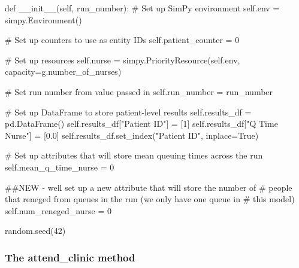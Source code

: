 \documentclass[
  letterpaper,
  DIV=11,
  numbers=noendperiod]{scrreprt}
\newenvironment{Shaded}{\begin{snugshade}}{\end{snugshade}}
\newcommand{\CommentTok}[1]{\textcolor[rgb]{0.37,0.37,0.37}{#1}}
\newcommand{\DecValTok}[1]{\textcolor[rgb]{0.68,0.00,0.00}{#1}}
\newcommand{\FloatTok}[1]{\textcolor[rgb]{0.68,0.00,0.00}{#1}}
\newcommand{\FunctionTok}[1]{\textcolor[rgb]{0.28,0.35,0.67}{#1}}
\newcommand{\KeywordTok}[1]{\textcolor[rgb]{0.00,0.23,0.31}{#1}}
\newcommand{\NormalTok}[1]{\textcolor[rgb]{0.00,0.23,0.31}{#1}}
\newcommand{\OperatorTok}[1]{\textcolor[rgb]{0.37,0.37,0.37}{#1}}
\newcommand{\StringTok}[1]{\textcolor[rgb]{0.13,0.47,0.30}{#1}}
\newcommand{\VariableTok}[1]{\textcolor[rgb]{0.07,0.07,0.07}{#1}}
\begin{document}
\begin{Shaded}
\begin{Highlighting}[]
\KeywordTok{def} \FunctionTok{\_\_init\_\_}\NormalTok{(}\VariableTok{self}\NormalTok{, run\_number):}
    \CommentTok{\# Set up SimPy environment}
    \VariableTok{self}\NormalTok{.env }\OperatorTok{=}\NormalTok{ simpy.Environment()}

    \CommentTok{\# Set up counters to use as entity IDs}
    \VariableTok{self}\NormalTok{.patient\_counter }\OperatorTok{=} \DecValTok{0}

    \CommentTok{\# Set up resources}
    \VariableTok{self}\NormalTok{.nurse }\OperatorTok{=}\NormalTok{ simpy.PriorityResource(}\VariableTok{self}\NormalTok{.env,}
\NormalTok{                                        capacity}\OperatorTok{=}\NormalTok{g.number\_of\_nurses)}

    \CommentTok{\# Set run number from value passed in}
    \VariableTok{self}\NormalTok{.run\_number }\OperatorTok{=}\NormalTok{ run\_number}

    \CommentTok{\# Set up DataFrame to store patient{-}level results}
    \VariableTok{self}\NormalTok{.results\_df }\OperatorTok{=}\NormalTok{ pd.DataFrame()}
    \VariableTok{self}\NormalTok{.results\_df[}\StringTok{"Patient ID"}\NormalTok{] }\OperatorTok{=}\NormalTok{ [}\DecValTok{1}\NormalTok{]}
    \VariableTok{self}\NormalTok{.results\_df[}\StringTok{"Q Time Nurse"}\NormalTok{] }\OperatorTok{=}\NormalTok{ [}\FloatTok{0.0}\NormalTok{]}
    \VariableTok{self}\NormalTok{.results\_df.set\_index(}\StringTok{"Patient ID"}\NormalTok{, inplace}\OperatorTok{=}\VariableTok{True}\NormalTok{)}

    \CommentTok{\# Set up attributes that will store mean queuing times across the run}
    \VariableTok{self}\NormalTok{.mean\_q\_time\_nurse }\OperatorTok{=} \DecValTok{0}

    \CommentTok{\#\#NEW {-} we\textquotesingle{}ll set up a new attribute that will store the number of}
    \CommentTok{\# people that reneged from queues in the run (we only have one queue in}
    \CommentTok{\# this model)}
    \VariableTok{self}\NormalTok{.num\_reneged\_nurse }\OperatorTok{=} \DecValTok{0}

\NormalTok{    random.seed(}\DecValTok{42}\NormalTok{)}
\end{Highlighting}
\end{Shaded}

\subsubsection{The attend\_clinic
method}\label{the-attend_clinic-method-2}
\end{document}
